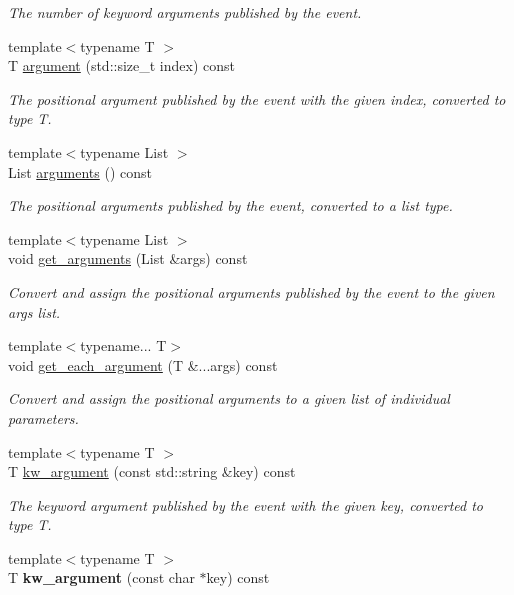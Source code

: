 \begin{DoxyCompactItemize}
\begin{DoxyCompactList}\small\item\em The number of keyword arguments published by the event. \end{DoxyCompactList}\item 
{\footnotesize template$<$typename T $>$ }\\T \hyperlink{classautobahn_1_1wamp__event_a63c48db45124c46c082992cdb0c53300}{argument} (std\+::size\+\_\+t index) const 
\begin{DoxyCompactList}\small\item\em The positional argument published by the event with the given {\ttfamily index}, converted to type T. \end{DoxyCompactList}\item 
{\footnotesize template$<$typename List $>$ }\\List \hyperlink{classautobahn_1_1wamp__event_add17b7623ab85ad698a333c5cfc0a554}{arguments} () const 
\begin{DoxyCompactList}\small\item\em The positional arguments published by the event, converted to a list type. \end{DoxyCompactList}\item 
{\footnotesize template$<$typename List $>$ }\\void \hyperlink{classautobahn_1_1wamp__event_a8d798d713e87e65a1d675ff729d20a76}{get\+\_\+arguments} (List \&args) const 
\begin{DoxyCompactList}\small\item\em Convert and assign the positional arguments published by the event to the given {\ttfamily args} list. \end{DoxyCompactList}\item 
{\footnotesize template$<$typename... T$>$ }\\void \hyperlink{classautobahn_1_1wamp__event_af3012ae4372214da75a5194874cd1738}{get\+\_\+each\+\_\+argument} (T \&...args) const 
\begin{DoxyCompactList}\small\item\em Convert and assign the positional arguments to a given list of individual parameters. \end{DoxyCompactList}\item 
{\footnotesize template$<$typename T $>$ }\\T \hyperlink{classautobahn_1_1wamp__event_a020e8ff3c02efe28c1aef202b367feae}{kw\+\_\+argument} (const std\+::string \&key) const 
\begin{DoxyCompactList}\small\item\em The keyword argument published by the event with the given {\ttfamily key}, converted to type T. \end{DoxyCompactList}\item 
{\footnotesize template$<$typename T $>$ }\\T {\bfseries kw\+\_\+argument} (const char $\ast$key) const \hypertarget{classautobahn_1_1wamp__event_a5eb40b018d2f497f97609f730f770ff1}{}\label{classautobahn_1_1wamp__event_a5eb40b018d2f497f97609f730f770ff1}


\end{DoxyCompactItemize}
